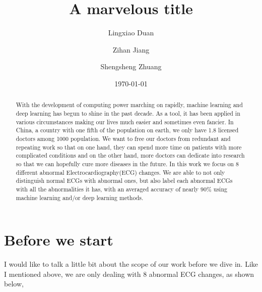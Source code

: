 \documentclass[%
 reprint,
 amsmath,amssymb,
 aps,
]{revtex4-2}
\begin{document}

\title{A marvelous title}%

\author{Lingxiao Duan}
%
\author{Zihan Jiang}
%
\author{Shengsheng Zhuang}
%


\date{\today}%

\begin{abstract}
  With the development of computing power marching on rapidly, machine learning and deep learning has begun to shine in the past decade. As a tool, it has been applied in various circumstances making our lives much easier and sometimes even fancier. In China, a country with one fifth of the population on earth, we only have 1.8 \cite{OECD} licensed doctors among 1000 population. We want to free our doctors from redundant and repeating work so that on one hand, they can spend more time on patients with more complicated conditions and on the other hand, more doctors can dedicate into research so that we can hopefully cure more diseases in the future. In this work we focus on 8 different abnormal Electrocardiography(ECG) changes. We are able to not only distinguish normal ECGs with abnormal ones, but also label each abnormal ECGs with all the abnormalities it has, with an averaged accuracy of nearly $90\%$ using machine learning and/or deep learning methods.
\end{abstract}

\maketitle



\section{Before we start}
I would like to talk a little bit about the scope of our work before we dive in. Like I mentioned above, we are only dealing with 8 abnormal ECG changes, as shown below,
\end{document}
